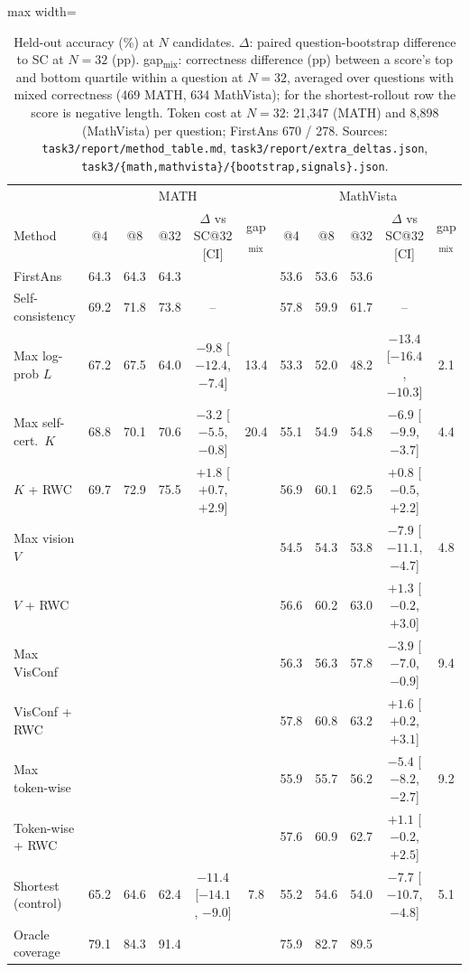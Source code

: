 \documentclass{article}
\begin{document}
\begin{table}[t]\centering\footnotesize\setlength{\tabcolsep}{3pt}
\begin{adjustbox}{max width=\linewidth}\begin{tabular}{lccccc|ccccc}\toprule
 & \multicolumn{5}{c|}{MATH} & \multicolumn{5}{c}{MathVista} \\
Method & @4 & @8 & @32 & $\Delta$ vs SC@32 [CI] & gap$_\text{mix}$ & @4 & @8 & @32 & $\Delta$ vs SC@32 [CI] & gap$_\text{mix}$ \\\midrule
FirstAns            & 64.3 & 64.3 & 64.3 & & & 53.6 & 53.6 & 53.6 & & \\
Self-consistency    & 69.2 & 71.8 & 73.8 & -- & & 57.8 & 59.9 & 61.7 & -- & \\
Max log-prob $L$    & 67.2 & 67.5 & 64.0 & $-9.8$ [$-12.4$, $-7.4$] & 13.4 & 53.3 & 52.0 & 48.2 & $-13.4$ [$-16.4$, $-10.3$] & 2.1 \\
Max self-cert.\ $K$ & 68.8 & 70.1 & 70.6 & $-3.2$ [$-5.5$, $-0.8$] & 20.4 & 55.1 & 54.9 & 54.8 & $-6.9$ [$-9.9$, $-3.7$] & 4.4 \\
$K$ + RWC           & 69.7 & 72.9 & 75.5 & $+1.8$ [$+0.7$, $+2.9$] & & 56.9 & 60.1 & 62.5 & $+0.8$ [$-0.5$, $+2.2$] & \\
Max vision $V$      & & & & & & 54.5 & 54.3 & 53.8 & $-7.9$ [$-11.1$, $-4.7$] & 4.8 \\
$V$ + RWC           & & & & & & 56.6 & 60.2 & 63.0 & $+1.3$ [$-0.2$, $+3.0$] & \\
Max VisConf         & & & & & & 56.3 & 56.3 & 57.8 & $-3.9$ [$-7.0$, $-0.9$] & 9.4 \\
VisConf + RWC       & & & & & & 57.8 & 60.8 & 63.2 & $+1.6$ [$+0.2$, $+3.1$] & \\
Max token-wise      & & & & & & 55.9 & 55.7 & 56.2 & $-5.4$ [$-8.2$, $-2.7$] & 9.2 \\
Token-wise + RWC    & & & & & & 57.6 & 60.9 & 62.7 & $+1.1$ [$-0.2$, $+2.5$] & \\
Shortest (control)  & 65.2 & 64.6 & 62.4 & $-11.4$ [$-14.1$, $-9.0$] & 7.8 & 55.2 & 54.6 & 54.0 & $-7.7$ [$-10.7$, $-4.8$] & 5.1 \\\midrule
Oracle coverage     & 79.1 & 84.3 & 91.4 & & & 75.9 & 82.7 & 89.5 & & \\\bottomrule
\end{tabular}\end{adjustbox}
\caption{Held-out accuracy (\%) at $N$ candidates. $\Delta$: paired question-bootstrap difference to SC at $N{=}32$ (pp). gap$_\text{mix}$: correctness difference (pp) between a score's top and bottom quartile within a question at $N{=}32$, averaged over questions with mixed correctness (469 MATH, 634 MathVista); for the shortest-rollout row the score is negative length. Token cost at $N{=}32$: 21{,}347 (MATH) and 8{,}898 (MathVista) per question; FirstAns 670 / 278. Sources: \texttt{task3/report/method\_table.md}, \texttt{task3/report/extra\_deltas.json}, \texttt{task3/\{math,mathvista\}/\{bootstrap,signals\}.json}.}\label{tab:t3}
\end{table}
\end{document}
